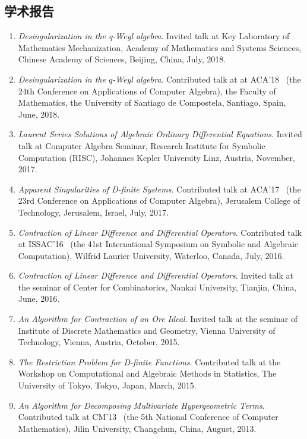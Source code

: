 \documentclass[a4paper,12pt]{article}
\begin{document}
\begin{CJK*}{UTF8}{gbsn}
\section*{\Large{学术报告}}
\begin{enumerate}
 \item {\em Desingularization in the q-Weyl algebra}. 
 Invited talk at Key Laboratory of Mathematics Mechanization, Academy of Mathematics and Systems Sciences,
 Chinese Academy of Sciences, Beijing, China, July, 2018. 
\item {\em Desingularization in the $q$-Weyl algebra}. 
 Contributed talk at at ACA'18 
 \ (the 24th Conference on Applications of Computer Algebra), the Faculty of Mathematics, 
 the University of Santiago de Compostela, Santiago, Spain, June, 2018.
 \item {\em Laurent Series Solutions of Algebraic Ordinary Differential Equations}. 
 Invited talk at Computer Algebra Seminar, Research Institute for Symbolic Computation (RISC), Johannes Kepler University Linz, 
 Austria, November, 2017.
 \item {\em Apparent Singularities of D-finite Systems}. Contributed talk at ACA'17 
 \ (the 23rd Conference on Applications of Computer Algebra), Jerusalem College of Technology, Jerusalem, Israel, July, 2017.
 \item {\em Contraction of Linear Difference and Differential Operators}. Contributed talk at ISSAC'16 
 \ (the 41st International Symposium on Symbolic and Algebraic Computation), Wilfrid Laurier University, Waterloo, Canada, July, 2016.
 \item {\em Contraction of Linear Difference and Differential Operators}.
       Invited talk at the seminar of Center for Combinatorics, Nankai University, Tianjin, China, June, 2016.
 \item {\em An Algorithm for Contraction of an Ore Ideal}. Invited talk at the seminar of Institute of Discrete Mathematics and Geometry, 
       Vienna University of Technology, Vienna, Austria, October, 2015.
 \item {\em The Restriction Problem for D-finite Functions}. 
       Contributed talk at the Workshop on Computational and Algebraic Methods in Statistics,
       The University of Tokyo, Tokyo, Japan, March, 2015.
 \item {\em An Algorithm for Decomposing Multivariate Hypergeometric Terms}. Contributed talk at CM'13
       \ (the 5th National Conference of Computer Mathematics), Jilin University, Changchun, China, August, 2013.
\end{enumerate}


\end{CJK*}
\end{document}
